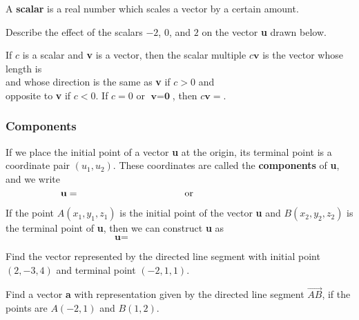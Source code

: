 \documentclass[notes]{subfiles}
\begin{document}
		\begin{defn}[Scalar]
			A \textbf{scalar} is a real number which scales a vector by a certain amount.
		\end{defn}
		\begin{ex}
			Describe the effect of the scalars $-2$, $0$, and $2$ on the vector \textbf{u} drawn below.
		\end{ex}
			\newpage
			
		\begin{rmk}
			If $c$ is a scalar and \textbf{v} is a vector, then the scalar multiple $c\textbf{v}$ is the vector whose length is \\[15pt]  and whose direction is the same as \textbf{v} if $c > 0$ and\\[15pt] opposite to \textbf{v} if $c < 0$.  If $c = 0$ or $\textbf{v} = \textbf{0}$, then $c\textbf{v} = $.
		\end{rmk}
		
	\subsubsection*{Components}
		\begin{defn}[Components]
			If we place the initial point of a vector \textbf{u} at the origin, its terminal point is a coordinate pair $(u_1,u_2)$.  These coordinates are called the \textbf{components} of \textbf{u}, and we write\\[15pt]
					\[\textbf{u} = \hspace{1.5in} \text{or} \hspace{1.5in}\]
		\end{defn}

		\begin{rmk}
			If the point $A(x_1,y_1,z_1)$ is the initial point of the vector \textbf{u} and $B(x_2,y_2,z_2)$ is the terminal point of \textbf{u}, then we can construct \textbf{u} as\\[15pt]
				\[\textbf{u} = \hspace{2in}\]
		\end{rmk}
		
		\begin{ex}
			Find the vector represented by the directed line segment with initial point $(2,-3,4)$ and terminal point $(-2,1,1)$.
		\end{ex}
			
		\begin{ex}
			Find a vector \textbf{a} with representation given by the directed line segment $\overrightarrow{AB}$, if the points are $A(-2,1)$ and $B(1,2)$.
		\end{ex}
			\newpage
		
\end{document}
